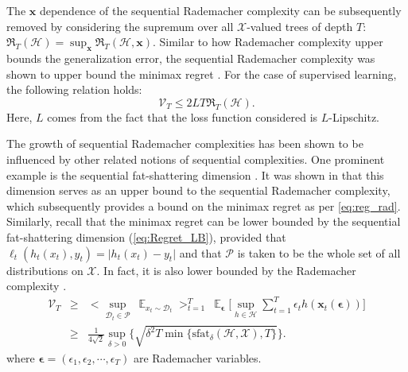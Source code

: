 The $\mathbf{x}$ dependence of the sequential Rademacher complexity can be subsequently removed by considering the supremum over all $\mathcal{X}$-valued trees of depth $T$: $\mathfrak{R}_T (\mathcal{H}) = \sup_{\mathbf{x}} \mathfrak{R}_T(\mathcal{H}, \mathbf{x})$. Similar to how Rademacher complexity upper bounds the generalization error, the sequential Rademacher complexity was shown to upper bound the minimax regret \citep{rakhlin2015online}. For the case of supervised learning, the following relation holds: 
\begin{equation}
\label{eq:reg_rad}
    \mathcal{V}_T \leq 2 L T \mathfrak{R}_T(\mathcal{H}).
\end{equation}
Here, $L$ comes from the fact that the loss function considered is $L$-Lipschitz. 

The growth of sequential Rademacher complexities has been shown to be influenced by other related notions of sequential complexities. One prominent example is the sequential fat-shattering dimension \citep{rakhlin2015online}. It was shown in \citet{rakhlin2015online} that this dimension serves as an upper bound to the sequential Rademacher complexity, which subsequently provides a bound on the minimax regret as per \cref{eq:reg_rad}. Similarly, recall that the minimax regret can be lower bounded by the sequential fat-shattering dimension (\cref{eq:Regret_LB}), provided that $\ell_t (h_t(x_t), y_t) = \vert h_t(x_t) - y_t \vert$ and that $\mathcal{P}$ is taken to be the whole set of all distributions on $\mathcal{X}$. In fact, it is also lower bounded by the Rademacher complexity \citep{rakhlin2015online, rakhlin2015sequential}. 
\begin{eqnarray}
\label{eq:Regret_LB_bis}
    \mathcal{V}_T &\geq& \Big< \sup_{\mathcal{D}_t \in \mathcal{P}} \ \mathop{\mathbb{E}}_{x_t \sim \mathcal{D}_t} \Big>_{t=1}^T  \ \mathop{\mathbb{E}}_{\boldsymbol{\epsilon}} \Big[ \sup_{h \in \mathcal{H}} \sum_{t=1}^T \epsilon_t h(\mathbf{x}_t(\boldsymbol{\epsilon})) \Big] \nonumber \\
    &\geq& \frac{1}{4 \sqrt{2}} \sup_{\delta > 0} \Big\{ \sqrt{\delta^2 T \min\{ \text{sfat}_\delta (\mathcal{H}, \mathcal{X}), T\}} \Big\}.
\end{eqnarray}
where ${\boldsymbol{\epsilon}} = (\epsilon_1, \epsilon_2, \cdots, \epsilon_T)$ are Rademacher variables. 